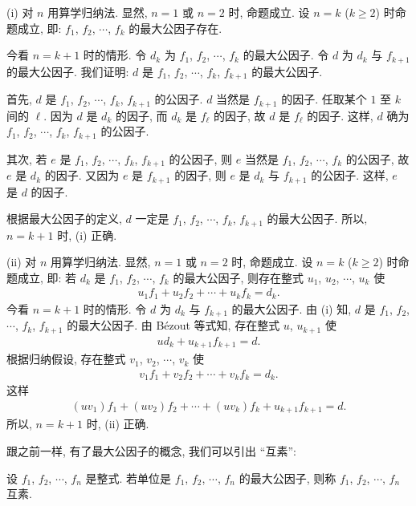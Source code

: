 \begin{pf}
    (i) 对 $n$ 用算学归纳法. 显然, $n = 1$ 或 $n = 2$ 时, 命题成立. 设 $n = k$ ($k \geq 2$) 时命题成立, 即: $f_1$, $f_2$, $\cdots$, $f_k$ 的最大公因子存在.

    今看 $n = k+1$ 时的情形. 令 $d_k$ 为 $f_1$, $f_2$, $\cdots$, $f_k$ 的最大公因子. 令 $d$ 为 $d_k$ 与 $f_{k+1}$ 的最大公因子. 我们证明: $d$ 是 $f_1$, $f_2$, $\cdots$, $f_k$, $f_{k+1}$ 的最大公因子.

    首先, $d$ 是 $f_1$, $f_2$, $\cdots$, $f_k$, $f_{k+1}$ 的公因子. $d$ 当然是 $f_{k+1}$ 的因子. 任取某个 $1$ 至 $k$ 间的 $\ell$. 因为 $d$ 是 $d_k$ 的因子, 而 $d_k$ 是 $f_{\ell}$ 的因子, 故 $d$ 是 $f_{\ell}$ 的因子. 这样, $d$ 确为 $f_1$, $f_2$, $\cdots$, $f_k$, $f_{k+1}$ 的公因子.

    其次, 若 $e$ 是 $f_1$, $f_2$, $\cdots$, $f_k$, $f_{k+1}$ 的公因子, 则 $e$ 当然是 $f_1$, $f_2$, $\cdots$, $f_{k}$ 的公因子, 故 $e$ 是 $d_k$ 的因子. 又因为 $e$ 是 $f_{k+1}$ 的因子, 则 $e$ 是 $d_k$ 与 $f_{k+1}$ 的公因子. 这样, $e$ 是 $d$ 的因子.

    根据最大公因子的定义, $d$ 一定是 $f_1$, $f_2$, $\cdots$, $f_k$, $f_{k+1}$ 的最大公因子. 所以, $n = k+1$ 时, (i) 正确.

    (ii) 对 $n$ 用算学归纳法. 显然, $n = 1$ 或 $n = 2$ 时, 命题成立. 设 $n = k$ ($k \geq 2$) 时命题成立, 即: 若 $d_k$ 是 $f_1$, $f_2$, $\cdots$, $f_k$ 的最大公因子, 则存在整式 $u_1$, $u_2$, $\cdots$, $u_k$ 使
    \begin{align*}
        u_1 f_1 + u_2 f_2 + \cdots + u_k f_k = d_k.
    \end{align*}
    今看 $n = k+1$ 时的情形. 令 $d$ 为 $d_k$ 与 $f_{k+1}$ 的最大公因子. 由 (i) 知, $d$ 是 $f_1$, $f_2$, $\cdots$, $f_k$, $f_{k+1}$ 的最大公因子. 由 Bézout 等式知, 存在整式 $u$, $u_{k+1}$ 使
    \begin{align*}
        u d_k + u_{k+1} f_{k+1} = d.
    \end{align*}
    根据归纳假设, 存在整式 $v_1$, $v_2$, $\cdots$, $v_k$ 使
    \begin{align*}
        v_1 f_1 + v_2 f_2 + \cdots + v_k f_k = d_k.
    \end{align*}
    这样
    \begin{align*}
        (uv_1) f_1 + (uv_2) f_2 + \cdots + (uv_k) f_k + u_{k+1} f_{k+1} = d.
    \end{align*}
    所以, $n = k+1$ 时, (ii) 正确.
\end{pf}

跟之前一样, 有了最大公因子的概念, 我们可以引出 ``互素'':
\begin{definition}
    设 $f_1$, $f_2$, $\cdots$, $f_n$ 是整式. 若单位是 $f_1$, $f_2$, $\cdots$, $f_n$ 的最大公因子, 则称 $f_1$, $f_2$, $\cdots$, $f_n$ 互素.
\end{definition}

